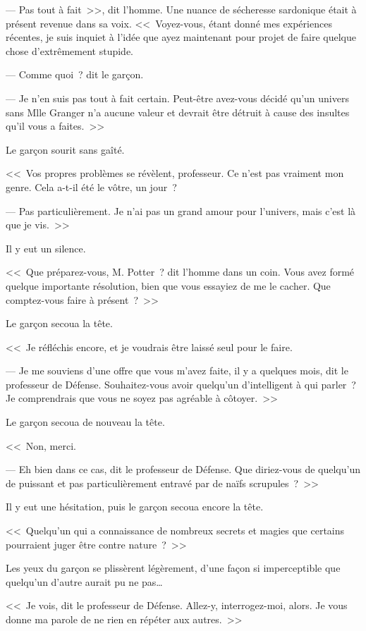 --- Pas tout à fait~>>, dit l'homme. Une nuance de sécheresse sardonique était à présent revenue dans sa voix. <<~Voyez-vous, étant donné mes expériences récentes, je suis inquiet à l'idée que ayez maintenant pour projet de faire quelque chose d'extrêmement stupide.

--- Comme quoi~? dit le garçon.

--- Je n'en suis pas tout à fait certain. Peut-être avez-vous décidé qu'un univers sans Mlle Granger n'a aucune valeur et devrait être détruit à cause des insultes qu'il vous a faites.~>>

Le garçon sourit sans gaîté.

<<~Vos propres problèmes se révèlent, professeur. Ce n'est pas vraiment mon genre. Cela a-t-il été le vôtre, un jour~?

--- Pas particulièrement. Je n'ai pas un grand amour pour l'univers, mais c'est là que je vis.~>>

Il y eut un silence.

<<~Que préparez-vous, M. Potter~? dit l'homme dans un coin. Vous avez formé quelque importante résolution, bien que vous essayiez de me le cacher. Que comptez-vous faire à présent~?~>>

Le garçon secoua la tête.

<<~Je réfléchis encore, et je voudrais être laissé seul pour le faire.

--- Je me souviens d'une offre que vous m'avez faite, il y a quelques mois, dit le professeur de Défense. Souhaitez-vous avoir quelqu'un d'intelligent à qui parler~? Je comprendrais que vous ne soyez pas agréable à côtoyer.~>>

Le garçon secoua de nouveau la tête.

<<~Non, merci.

--- Eh bien dans ce cas, dit le professeur de Défense. Que diriez-vous de quelqu'un de puissant et pas particulièrement entravé par de naïfs scrupules~?~>>

Il y eut une hésitation, puis le garçon secoua encore la tête.

<<~Quelqu'un qui a connaissance de nombreux secrets et magies que certains pourraient juger être contre nature~?~>>

Les yeux du garçon se plissèrent légèrement, d'une façon si imperceptible que quelqu'un d'autre aurait pu ne pas…

<<~Je vois, dit le professeur de Défense. Allez-y, interrogez-moi, alors. Je vous donne ma parole de ne rien en répéter aux autres.~>>

